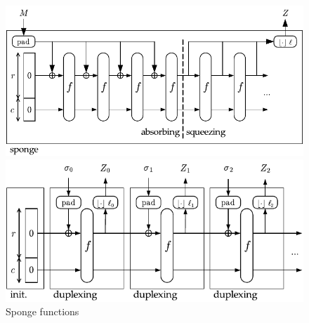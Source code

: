 \begin{figure}
  \begin{minipage}{\textwidth}
    \centering
    \includegraphics[scale=0.8]{images/sponge.pdf}
  \end{minipage}
  \begin{minipage}{\textwidth}
    \centering
    \includegraphics[scale=0.8]{images/duplex.pdf}
  \end{minipage}

  \caption{Sponge functions}
  \label{figure/sponge-functions}
\end{figure}
